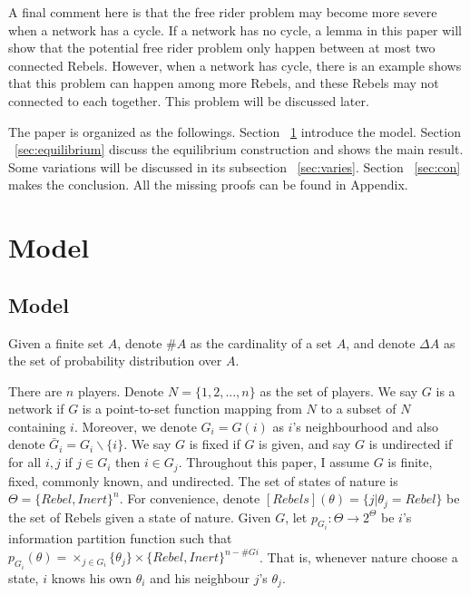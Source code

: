 \documentclass[12pt,letter]{article}
\theoremstyle{definition}
\theoremstyle{remark}
\theoremstyle{claim}
\begin{document}
A final comment here is that the free rider problem may become more severe when a network has a cycle. If a network has no cycle, a lemma in this paper will show that the potential free rider problem only happen between at most two connected Rebels. However, when a network has cycle, there is an example shows that this problem can happen among more Rebels, and these Rebels may not connected to each together. This problem will be discussed later.

The paper is organized as the followings. Section ~\ref{sec:model} introduce the model. Section ~\ref{sec:equilibrium} discuss the equilibrium construction and shows the main result. Some variations will be discussed in its subsection ~\ref{sec:varies}. Section ~\ref{sec:con} makes the conclusion. All the missing proofs can be found in Appendix.

\section{Model}
\label{sec:model}
\subsection{Model}
Given a finite set $A$, denote $\#A$ as the cardinality of a set $A$, and denote $\Delta A$ as the set of probability distribution over $A$.

There are $n$ players. Denote $N=\{1,2,...,n\}$ as the set of players.  We say $G$ is a network if $G$ is a point-to-set function mapping from $N$ to a subset of $N$ containing $i$. Moreover, we denote $G_i=G(i)$ as $i$'s neighbourhood and also denote $\bar{G}_i=G_i\backslash \{i\}$. We say $G$ is fixed if $G$ is given, and say $G$ is undirected if for all $i,j$ if $j\in G_i$ then $i\in G_j$. Throughout this paper, I assume $G$ is finite, fixed, commonly known, and undirected. The set of states of nature is $\Theta=\{Rebel,Inert\}^n$. For convenience, denote $[Rebels](\theta)=\{j|\theta_j=Rebel\}$ be the set of Rebels given a state of nature. Given $G$, let $p_{G_i}:\Theta \rightarrow 2^{\Theta}$ be $i$'s information partition function such that $p_{G_i}(\theta)=\times_{j\in G_i}\{\theta_j\}\times \{Rebel,Inert\}^{n-\#G{i}}$. That is, whenever nature choose a state, $i$ knows his own $\theta_i$ and his neighbour $j$'s $\theta_j$. 
\end{document}
